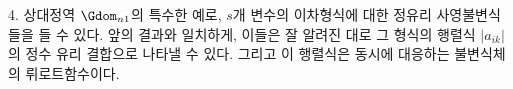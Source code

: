 
4. 상대정역 $\Gdom_{n1}$의 특수한 예로, $s$개 변수의 이차형식에 대한 정유리 사영불변식들을 들 수 있다. 앞의 결과와 일치하게, 이들은 잘 알려진 대로 그 형식의 행렬식 $|a_{ik}|$의 정수 유리 결합으로 나타낼 수 있다. 그리고 이 행렬식은 동시에 대응하는 불변식체의 뤼로트함수이다.
